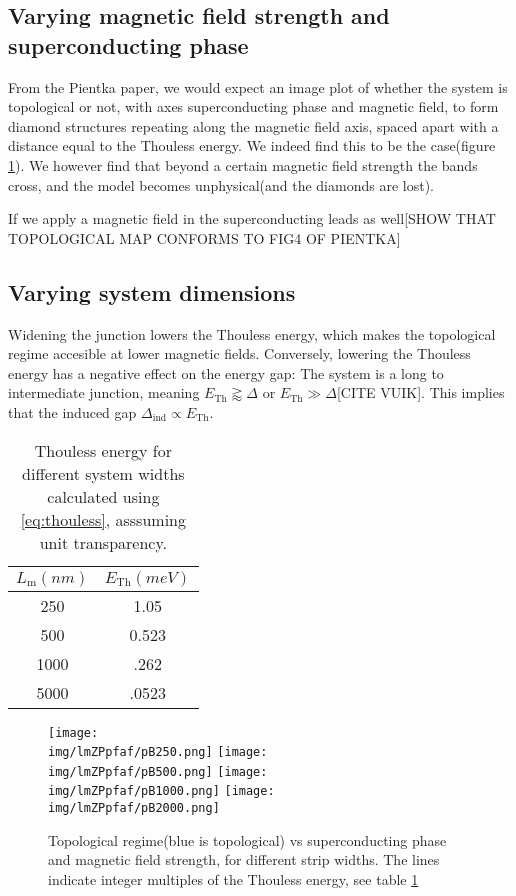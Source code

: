 \documentclass[10pt,a4paper]{article}
\newcommand{\img}{./images}
\begin{document}
	\subsection{Varying magnetic field strength and superconducting phase}
		From the Pientka paper, we would expect an image plot of whether the system is topological or not, with axes superconducting phase and magnetic field, to form diamond structures repeating along the magnetic field axis, spaced apart with a distance equal to the Thouless energy. We indeed find this to be the case(figure \ref{fig:lmZPpfaf}). We however find that beyond a certain magnetic field strength the bands cross, and the model becomes unphysical(and the diamonds are lost). 
		
		If we apply a magnetic field in the superconducting leads as well[SHOW THAT TOPOLOGICAL MAP CONFORMS TO FIG4 OF PIENTKA]
		
		
	\subsection{Varying system dimensions}
	 Widening the junction lowers the Thouless energy, which makes the topological regime accesible at lower magnetic fields. Conversely, lowering the Thouless energy has a negative effect on the energy gap: The system is a long to intermediate junction, meaning $E_\text{Th} \gtrapprox \Delta$ or $E_\text{Th} \gg \Delta$[CITE VUIK]. This implies that the induced gap $\Delta_\text{ind} \propto E_\text{Th}$.
	\begin{table}[H]
		\centering
		\begin{tabular}{|c|c|}
			\hline 
			$L_\text{m} (nm)$ & $E_\text{Th} (meV)$ \\ 
			\hline 
			250 & 1.05 \\ 
			\hline 
			500 & 0.523 \\ 
			\hline 
			1000 & .262 \\ 
			\hline 
			5000 & .0523 \\ 
			\hline 
		\end{tabular} 
		\caption{Thouless energy for different system widths calculated using \ref{eq:thouless}, asssuming unit transparency.}
		\label{table:thouless}
	\end{table}
	
	\begin{figure}[H]
		\texttt{[image: \\img/lmZPpfaf/pB250.png]}
		\texttt{[image: \\img/lmZPpfaf/pB500.png]}
		\texttt{[image: \\img/lmZPpfaf/pB1000.png]}
		\texttt{[image: \\img/lmZPpfaf/pB2000.png]}
		\caption{Topological regime(blue is topological) vs superconducting phase and magnetic field strength, for different strip widths. The lines indicate integer multiples of the Thouless energy, see table \ref{table:thouless}}
		\label{fig:lmZPpfaf}
	\end{figure}
	
\end{document}

